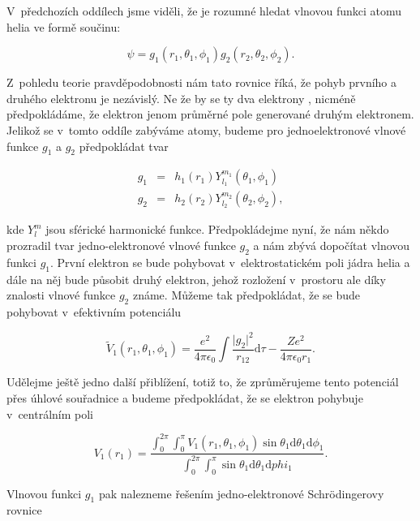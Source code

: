 V~předchozích oddílech jsme viděli, že je rozumné hledat vlnovou funkci atomu helia ve formě součinu:
 
\begin{equation}
\psi = g_1(r_1, \theta_1, \phi_1) g_2(r_2,\theta_2, \phi_2).
\label{rov:VE-39}
\end{equation}
 
\noindent Z~pohledu teorie pravděpodobnosti nám tato rovnice říká, že pohyb prvního a druhého elektronu je nezávislý. Ne že by se ty dva elektrony , nicméně předpokládáme, že elektron  jenom průměrné pole generované druhým elektronem. Jelikož se v~tomto oddíle zabýváme atomy, budeme pro jednoelektronové vlnové funkce $g_1$ a $g_2$ předpokládat tvar 
  
\begin{eqnarray}
g_1 &=& h_1(r_1) Y_{l_1}^{m_1} (\theta_1,\phi_1) \\
g_2 &=& h_2(r_2) Y_{l_2}^{m_2} (\theta_2,\phi_2),
\end{eqnarray}
  
\noindent kde $Y_{l}^{m}$ jsou sférické harmonické funkce. Předpokládejme nyní, že nám někdo prozradil tvar jedno-elektronové vlnové funkce $g_2$ a nám zbývá dopočítat vlnovou funkci $g_1$. První elektron se bude pohybovat v~elektrostatickém poli jádra helia a dále na něj bude působit druhý elektron, jehož rozložení v~prostoru ale díky znalosti vlnové funkce $g_2$ známe. Můžeme tak předpokládat, že se bude pohybovat v~efektivním potenciálu
  
\begin{equation}
\tilde{V}_1 (r_1, \theta_1,\phi_1) = \frac{e^2}{4 \pi \epsilon_0} \int \frac{\vert g_2 \vert^2}{r_{12}} \mathrm{d}\tau - \frac{Z e^2}{4 \pi \epsilon_0 r_1}.
\label{rov:VE-40}
\end{equation}
  
Udělejme ještě jedno další přiblížení, totiž to, že zprůměrujeme tento potenciál přes úhlové souřadnice a budeme předpokládat, že se elektron pohybuje v~centrálním poli
 
\begin{equation}
V_1(r_1) = \frac{\int_0^{2 \pi} \int_0^{\pi} V_1(r_1,\theta_1,\phi_1) \sin \theta_1 \mathrm{d}\theta_1 \mathrm{d}\phi_1}{\int_0^{2 \pi} \int_0^{\pi} \sin \theta_1 \mathrm{d}\theta_1 \mathrm{d}phi_1}.
\label{rov:VE-41}
\end{equation}
 
 
\noindent Vlnovou funkci $g_1$ pak nalezneme řešením  jedno-elektronové Schr\"odingerovy rovnice
 
